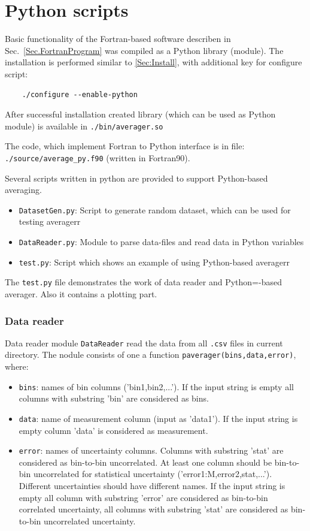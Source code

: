 \section{Python scripts}
\label{sec:python}

Basic functionality of the Fortran-based software describen in Sec.~\ref{Sec.FortranProgram} was compiled as a Python library (module). The installation is performed similar to \ref{Sec:Install}, with additional key for configure script:
\begin{verbatim}
    ./configure --enable-python
\end{verbatim}
After successful installation created library (which can be used as Python module) is available in {\tt ./bin/averager.so }

The code, which implement Fortran to Python interface is in file:  {\tt ./source/average\_py.f90} (written in Fortran90).

Several scripts written in python are provided to support Python-based averaging.

\begin{itemize}
\item {\tt DatasetGen.py}: Script to generate random dataset, which can be used for testing averagerr
\item {\tt DataReader.py}: Module to parse data-files and read data in Python variables
\item {\tt test.py}: Script which shows an example of using Python-based averagerr
\end{itemize}

The {\tt test.py} file demonstrates the work of data reader and Python=-based averager. Also it contains a plotting part.

\subsubsection{Data reader}

Data reader module {\tt DataReader} read the data from all {\tt .csv} files in current directory. The nodule consists of one a function {\tt paverager(bins,data,error)}, where:

\begin{itemize}
\item {\tt bins}: names of bin columns ('bin1,bin2,...'). If the input string is empty all columns with substring 'bin' are considered as bins. 
\item {\tt data}: name of measurement column (input as 'data1'). If the input string is empty column 'data' is considered as measurement.
\item {\tt error}: names of uncertainty columns. Columns with substring 'stat' are considered as bin-to-bin uncorrelated. At least one column should be bin-to-bin uncorrelated for statistical uncertainty ('error1:M,error2,stat,...'). Different uncertainties should have different names. If the input string is empty all column with substring 'error' are considered as bin-to-bin correlated uncertainty, all columns with substring 'stat' are considered as bin-to-bin uncorrelated uncertainty.
\end{itemize}

